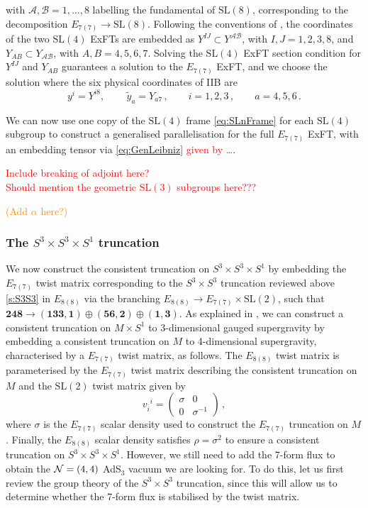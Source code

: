 \documentclass[a4paper, 11pt]{article}
\numberwithin{equation}{section}
\newcommand{\ov}[1]{\overline{#1}}
\newcommand{\SL}[1]{\mathrm{SL}( #1 )}
\newcommand{\EE}{\ensuremath{E_{8(8)}}\xspace}
\newcommand{\En}[1]{E_{#1(#1)}}
\newcommand{\+}{\oplus}
\newcommand{\cA}{\mathcal{A}}
\newcommand{\cB}{\mathcal{B}}
\newcommand{\EM}[1]{\textcolor{red}{#1}}
\newcommand{\CE}[1]{\textcolor{darkorange}{#1}}
\begin{document}
with $\cA, \cB = 1, \ldots, 8$ labelling the fundamental of $\SL{8}$, corresponding to the decomposition $\En{7} \rightarrow \SL{8}$. Following the conventions of \cite{Inverso:2017lrz}, the coordinates of the two $\SL{4}$ ExFTs are embedded as $Y^{IJ} \subset Y^{\cA\cB}$, with $I, J = 1, 2, 3, 8$, and $Y_{AB} \subset Y_{\cA\cB}$, with $A, B = 4, 5, 6, 7$. Solving the $\SL{4}$ ExFT section condition for $Y^{IJ}$ and $Y_{AB}$ guarantees a solution to the $\En{7}$ ExFT, and we choose the solution where the six physical coordinates of IIB are
\begin{equation} \label{eq:PhysicalCoords}
	y^i = Y^{i8},\, \qquad \tilde{y}_a = Y_{a7} \,, \qquad i = 1, 2, 3 \,, \qquad a = 4, 5, 6 \,.
\end{equation}

We can now use one copy of the $\SL{4}$ frame \eqref{eq:SLnFrame} for each $\SL{4}$ subgroup to construct a generalised parallelisation for the full $\En{7}$ ExFT, with an embedding tensor via \eqref{eq:GenLeibniz} \EM{given by \ldots}.

\EM{Include breaking of adjoint here?}\\
\EM{Should mention the geometric $\SL{3}$ subgroups here???}

\CE{(Add $\alpha$ here?)}

\subsubsection{The $S^3 \times S^3 \times S^1$ truncation} \label{s:S3S3S1}
We now construct the consistent truncation on $S^3 \times S^3 \times S^1$ by embedding the $\En{7}$ twist matrix corresponding to the $S^3 \times S^3$ truncation reviewed above \ref{s:S3S3} in $\EE$ via the branching $\EE \rightarrow \En{7} \times \SL{2}$, such that $\mathbf{248} \rightarrow \mathbf{\left(133,1\right)} \oplus \mathbf{\left(56,2\right)} \oplus \mathbf{\left(1,3\right)}$. As explained in \cite{Galli:2022idq}, we can construct a consistent truncation on $M \times S^1$ to 3-dimensional gauged supergravity by embedding a consistent truncation on $M$ to 4-dimensional supergravity, characterised by a $\En{7}$ twist matrix, as follows. The $\EE$ twist matrix is parameterised by the $\En{7}$ twist matrix describing the consistent truncation on $M$ and the $\SL{2}$ twist matrix given by
\begin{equation}
	v_{\ov{i}}{}^i = \begin{pmatrix}
		\sigma & 0 \\ 0 & \sigma^{-1}
	\end{pmatrix} \,,
\end{equation}
where $\sigma$ is the $\En{7}$ scalar density used to construct the $\En{7}$ truncation on $M$. Finally, the $\EE$ scalar density satisfies $\rho = \sigma^2$ to ensure a consistent truncation on $S^3 \times S^3 \times S^1$. However, we still need to add the 7-form flux to obtain the ${\cal N}=(4,4)$ AdS$_3$ vacuum we are looking for. To do this, let us first review the group theory of the $S^3 \times S^3$ truncation, since this will allow us to determine whether the 7-form flux is stabilised by the twist matrix.
\end{document}
